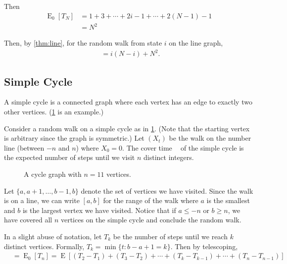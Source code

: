 \documentclass[12pt]{article}
\theoremstyle{definition}
\DeclareMathOperator{\E}{\mathrm{E}}		     %
\DeclareMathOperator{\tcov}{t_\textrm{cov}}      %
\begin{document}
Then
\begin{align}
\E_0[T_N] &= 1 + 3 + \cdots + 2i - 1 + \cdots + 2(N-1) -1 \nonumber \\
&= N^2 \nonumber
\end{align}

Then, by \cref{thm:line}, for the random walk from state $i$ on the line graph,
\begin{align}
\tcov = i(N-i) + N^2. \nonumber
\end{align}

\subsection{Simple Cycle}\label{sec:simple_cycle}

A simple cycle is a connected graph where
each vertex has an edge to exactly two other vertices.
(\cref{fig:cycle} is an example.)

Consider a random walk on a simple cycle as in \cref{fig:cycle}.
(Note that the starting vertex is arbitrary since the graph is symmetric.)
Let $(X_t)$ be the walk on the number line (between $-n$ and $n$)
where $X_0 = 0$.
The cover time $\tcov$ of the simple cycle is the expected number of steps 
until we visit $n$ distinct integers.

\begin{figure}[ht]
	\centering
	\caption{A cycle graph with $n=11$ vertices.}\label{fig:cycle}
\end{figure}

Let $\{a, a+1, \ldots, b-1, b\}$ 
denote the set of vertices we have visited.
Since the walk is on a line, we can write $[a,b]$ for the range
of the walk where $a$ is the smallest 
and $b$ is the largest vertex we have visited.
Notice that if $a \leq -n$ or $b \geq n$, we have covered all $n$ vertices
on the simple cycle and conclude the random walk.

In a slight abuse of notation, let $T_k$ be the 
number of steps until we reach $k$ distinct vertices.
Formally, $T_k = \min\{t: b-a+1 = k\}$.
Then by telescoping,
\begin{align}
\tcov &= \E_0[T_n] = \E[(T_2 - T_1) + (T_3 - T_2) + \cdots + 
(T_k - T_{k-1}) + \cdots + (T_n - T_{n-1})] \nonumber
\end{align}
\end{document}
